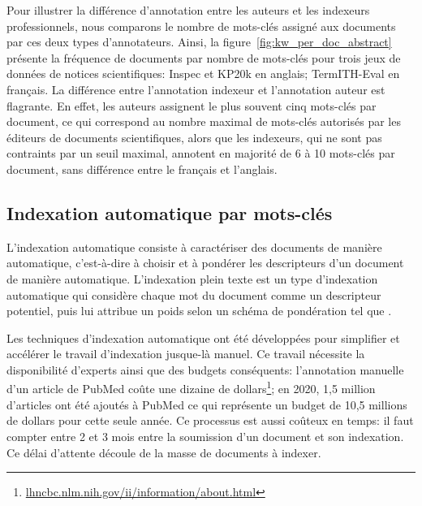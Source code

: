 Pour illustrer la différence d'annotation entre les auteurs et les indexeurs professionnels, nous comparons le nombre de mots-clés assigné aux documents par ces deux types d'annotateurs. Ainsi, la figure~\ref{fig:kw_per_doc_abstract} présente la fréquence de documents par nombre de mots-clés pour trois jeux de données de notices scientifiques: Inspec et KP20k en anglais; TermITH-Eval en français.
La différence entre l'annotation indexeur et l'annotation auteur est flagrante. En effet, les auteurs assignent le plus souvent cinq mots-clés par document, ce qui correspond au nombre maximal de mots-clés autorisés par les éditeurs de documents scientifiques, alors que les indexeurs, qui ne sont pas contraints par un seuil maximal, annotent en majorité de 6 à 10 mots-clés par document, sans différence entre le français et l'anglais.


\subsection{Indexation automatique par mots-clés}


L'indexation automatique consiste à caractériser des documents de manière automatique, c'est-à-dire à choisir et à pondérer les descripteurs d'un document de manière automatique.
L'indexation plein texte est un type d'indexation automatique qui considère chaque mot du document comme un descripteur potentiel, puis lui attribue un poids selon un schéma de pondération tel que \tfidf{}.

Les techniques d'indexation automatique ont été développées pour simplifier et accélérer le travail d'indexation jusque-là manuel. Ce travail nécessite la disponibilité d'experts ainsi que des budgets conséquents: l'annotation manuelle d'un article de PubMed coûte une dizaine de dollars\footnote{\href{https://lhncbc.nlm.nih.gov/ii/information/about.html}{lhncbc.nlm.nih.gov/ii/information/about.html}}; en 2020, 1,5 million d'articles ont été ajoutés à PubMed ce qui représente un budget de 10,5 millions de dollars pour cette seule année.
Ce processus est aussi coûteux en temps: il faut compter entre 2 et 3 mois entre la soumission d'un document et son indexation. Ce délai d'attente découle de la masse de documents à indexer. 

